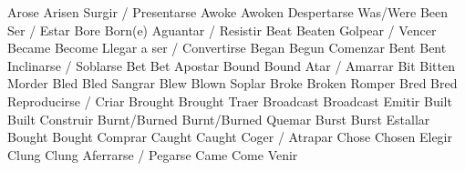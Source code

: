               {Arose}{}	            {Arisen}{}              {Surgir / Presentarse}{}
              {Awoke}{}	            {Awoken}{}              {Despertarse}{}
                 {Was/Were}{}	        {Been}{}                {Ser / Estar}{}
               {Bore}{}	            {Born(e)}{}             {Aguantar / Resistir}{}
	            {Beat}{}	            {Beaten}{}              {Golpear / Vencer}{}
	            {Became}{}	            {Become}{}              {Llegar a ser / Convertirse}{}
	            {Began}{}	            {Begun}{}               {Comenzar}{}
	            {Bent}{}	            {Bent}{}                {Inclinarse / Soblarse}{}
	            {Bet}{}	                {Bet}{}                 {Apostar}{}
	            {Bound}{}	            {Bound}{}               {Atar / Amarrar}{}
	            {Bit}{}	                {Bitten}{}              {Morder}{}
	            {Bled}{}	            {Bled}{}                {Sangrar}{}
	            {Blew}{}	            {Blown}{}               {Soplar}{}
	            {Broke}{}	            {Broken}{}              {Romper}{}
	            {Bred}{}	            {Bred}{}                {Reproducirse / Criar}{}
	            {Brought}{}	            {Brought}{}             {Traer}{}
	        {Broadcast}{}	        {Broadcast}{}           {Emitir}{}
	            {Built}{}	            {Built}{}               {Construir}{}
	            {Burnt/Burned}{}	    {Burnt/Burned}{}        {Quemar}{}
	            {Burst}{}	            {Burst}{}               {Estallar}{}
	            {Bought}{}	            {Bought}{}              {Comprar}{}
	            {Caught}{}	            {Caught}{}              {Coger / Atrapar}{}
	            {Chose}{}	            {Chosen}{}              {Elegir}{}
	            {Clung}{}	            {Clung}{}               {Aferrarse / Pegarse}{}
	            {Came}{}	            {Come}{}                {Venir}{}
